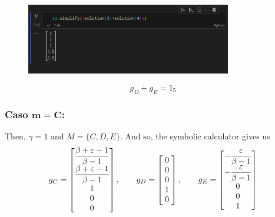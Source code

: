 \begin{figure}[H]
    \centering
    \includegraphics[width=0.8\textwidth]{../pictures/ex2-1.png}
\end{figure}

\[ g_D + g_E = 1_5\]

\subsubsection*{Caso $\boldsymbol{m = C}$:}
Then, $\gamma = 1$ and $M = \{C,D,E\}$. And so, the symbolic calculator gives us
\renewcommand*{\arraystretch}{1.7}
\[\everymath{\displaystyle} g_C = \left[\begin{matrix}\frac{\beta + \varepsilon - 1}{\beta - 1}\\\frac{\beta + \varepsilon - 1}{\beta - 1}\\1\\0\\0\end{matrix}\right], \hspace*{2em}
g_D = \left[\begin{matrix}\;0\;\\\;0\;\\\;0\;\\\;1\;\\\;0\;\end{matrix}\right], \hspace*{2em}
g_E =\left[\begin{matrix}- \frac{\varepsilon}{\beta - 1}\\- \frac{\varepsilon}{\beta - 1}\\0\\0\\1\end{matrix}\right] \]

